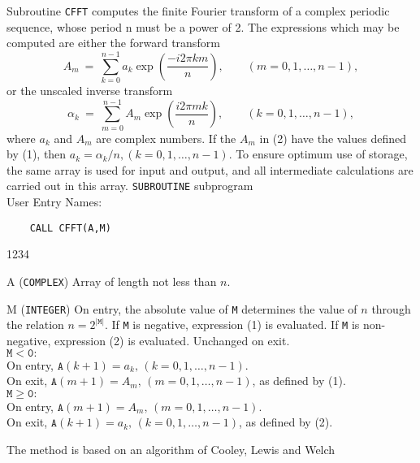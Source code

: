                                  
                     
\Submitter{}                                    
Subroutine {\tt CFFT} computes the finite Fourier transform of a complex
periodic sequence, whose period n must be a power of 2. The
expressions which may be computed are either the forward transform
\begin{equation}
A_m \ = \ \sum ^{n-1}_{k=0}a_k \exp \left( \frac{-i 2\pi km}{n} \right),
\qquad (m=0,1,\ldots,n-1),
\end{equation}
or the unscaled inverse transform
\begin{equation}
\alpha_k \ = \
\sum ^{n-1}_{m=0} A_m \exp \left( \frac{i 2\pi mk}{n} \right),
\qquad (k=0,1,\ldots,n-1),
\end{equation}
where $a_k$ and $A_m$ are complex numbers.
If the $A_m$ in (2) have the values defined by (1), then
$a_k=\alpha_k/n, (k=0,1,\ldots,n-1)$.
To ensure optimum use of storage, the same array is used for input and
output, and all intermediate calculations are carried out in this array.
\Structure
{\tt SUBROUTINE} subprogram \\
User Entry Names: 
\Usage
\begin{verbatim}
    CALL CFFT(A,M)
\end{verbatim}
\begin{DLtt}{1234}
\item[A] ({\tt COMPLEX}) Array of length not less than $n$.
\item[M] ({\tt INTEGER}) On entry, the absolute value of {\tt M}
determines the value of $n$ through the relation $n=2^{\mathtt{|M|}}$.
If {\tt M} is negative, expression (1) is evaluated. If {\tt M} is
non-negative, expression (2) is evaluated. Unchanged on exit. \\
$\mathtt{M<0:}$ \\
On entry, $\mathtt{A}(k+1)=a_k,\,(k=0,1,\ldots,n-1)$.\\
On exit, $\mathtt{A}(m+1)=A_m,\,(m=0,1,\ldots,n-1)$, as defined by
(1). \\
$\mathtt{M\geq 0:}$ \\
On entry, $\mathtt{A}(m+1)=A_m,\,(m=0,1,\ldots,n-1)$. \\
On exit, $\mathtt{A}(k+1)=a_k,\,(k=0,1,\ldots,n-1)$,
as defined by (2).
\end{DLtt}
\Method
The method is based on an algorithm of Cooley, Lewis and Welch
